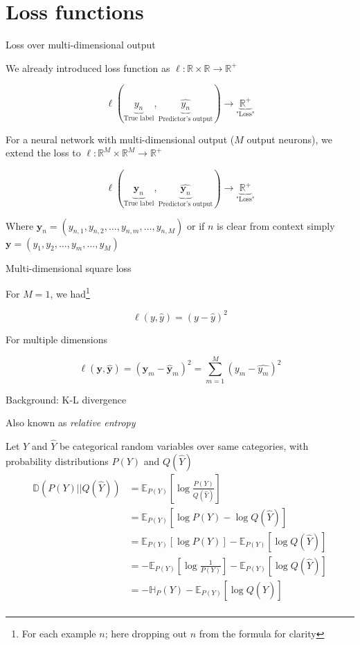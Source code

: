 \documentclass[12pt]{beamer}
\begin{document}
\section{Loss functions}


\begin{frame}{Loss over multi-dimensional output}

We already introduced loss function as  $\ell : \mathbb{R} \times \mathbb{R} \to \mathbb{R}^+$

$$
\ell(\underbrace{y_n}_{\text{True label}}, \underbrace{\hat{y_n}}_{\text{Predictor's output}}) \to \underbrace{\mathbb{R}^{+}}_{\text{"Loss"}}
$$

For a neural network with multi-dimensional output ($M$ output neurons), we extend the loss to $\ell : \mathbb{R}^M \times \mathbb{R}^M \to \mathbb{R}^+$


$$
\ell(\underbrace{\mathbf{y}_n}_{\text{True label}}, \underbrace{\hat{\mathbf{y}_n}}_{\text{Predictor's output}}) \to \underbrace{\mathbb{R}^{+}}_{\text{"Loss"}}
$$

Where $\mathbf{y}_n = (y_{n,1}, y_{n, 2}, \dots, y_{n,m}, \dots, y_{n,M})$ or if $n$ is clear from context simply $\mathbf{y} = (y_{1}, y_{2}, \dots, y_{m}, \dots, y_{M})$



\end{frame}


\begin{frame}{Multi-dimensional square loss}

For $M = 1$, we had\footnote{For each example $n$; here dropping out $n$ from the formula for clarity}

$$
\ell(y, \hat{y}) = (y - \hat{y})^2
$$

For multiple dimensions

$$
\ell(\mathbf{y}, \hat{\mathbf{y}}) =  (\mathbf{y}_m - \hat{\mathbf{y}}_m)^2 = \sum_{m = 1}^{M} (y_m - \hat{y_m})^2
$$


\end{frame}


\begin{frame}{Background: K-L divergence}
	
Also known as \emph{relative entropy}

Let $Y$ and $\hat{Y}$ be categorical random variables over same categories, with probability distributions $P(Y)$ and $Q(\hat{Y})$
	\begin{align*}
	\mathbb{D}(P(Y) || Q(\hat{Y})) &= \mathbb{E}_{P(Y)} \left[ \log \frac{P(Y)}{Q(\hat{Y})} \right] \\
	&= \mathbb{E}_{P(Y)} \left[ \log P(Y) - \log Q(\hat{Y}) \right] \\
	&= \mathbb{E}_{P(Y)} \left[ \log P(Y)\right] - \mathbb{E}_{P(Y)} \left[ \log Q(\hat{Y}) \right] \\
	&= - \mathbb{E}_{P(Y)} \left[ \log \frac{1}{P(Y)}\right] - \mathbb{E}_{P(Y)} \left[ \log Q(\hat{Y}) \right] \\
	&= - \mathbb{H}_{P} (Y)  - \mathbb{E}_{P(Y)} \left[ \log Q(\hat{Y}) \right] \\
	\end{align*}
	

	
\end{frame}
\end{document}
